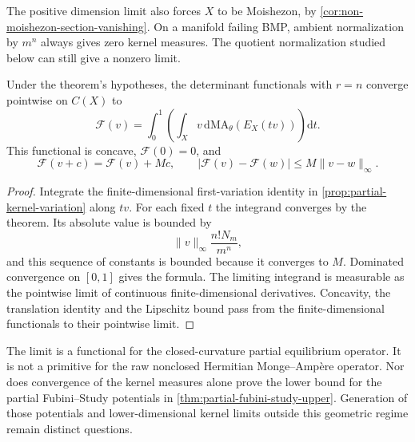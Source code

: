 The positive dimension limit also forces $X$ to be Moishezon, by \cref{cor:non-moishezon-section-vanishing}. On a manifold failing BMP, ambient normalization by $m^n$ always gives zero kernel measures. The quotient normalization studied below can still give a nonzero limit.

\begin{corollary}\label{cor:fujiki-partial-determinant}
Under the theorem's hypotheses, the determinant functionals with $r=n$ converge pointwise on $C(X)$ to
\[
 \mathcal F(v)=\int_0^1\!\left(\int_X
       v\,\mathrm{d}\mathrm{MA}_\theta(E_X(tv))\right)\mathrm{d}t.
\]
This functional is concave, $\mathcal F(0)=0$, and
\[
 \mathcal F(v+c)=\mathcal F(v)+Mc,\qquad
 |\mathcal F(v)-\mathcal F(w)|\leq M\|v-w\|_\infty.
\]
\end{corollary}
\begin{proof}
Integrate the finite-dimensional first-variation identity in \cref{prop:partial-kernel-variation} along $tv$. For each fixed $t$ the integrand converges by the theorem. Its absolute value is bounded by
\[
 \|v\|_\infty\frac{n!N_m}{m^n},
\]
and this sequence of constants is bounded because it converges to $M$. Dominated convergence on $[0,1]$ gives the formula. The limiting integrand is measurable as the pointwise limit of continuous finite-dimensional derivatives. Concavity, the translation identity and the Lipschitz bound pass from the finite-dimensional functionals to their pointwise limit.
\end{proof}

The limit is a functional for the closed-curvature partial equilibrium operator. It is not a primitive for the raw nonclosed Hermitian Monge--Amp\`ere operator. Nor does convergence of the kernel measures alone prove the lower bound for the partial Fubini--Study potentials in \cref{thm:partial-fubini-study-upper}. Generation of those potentials and lower-dimensional kernel limits outside this geometric regime remain distinct questions.
